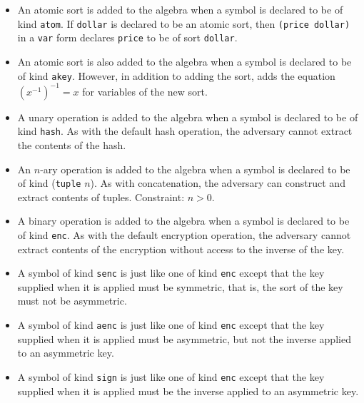 \begin{itemize}

\item An atomic sort is added to the algebra when a symbol is declared
  to be of kind \texttt{atom}.  If \texttt{dollar} is declared to be
  an atomic sort, then \verb|(price dollar)| in a \texttt{var} form
  declares \texttt{price} to be of sort \texttt{dollar}.

\item An atomic sort is also added to the algebra when a symbol is declared
  to be of kind \texttt{akey}.  However, in addition to adding the
  sort, {\cpsa} adds the equation $(x^{-1})^{-1}=x$ for variables of
  the new sort.

\item A unary operation is added to the algebra when a symbol is
  declared to be of kind \texttt{hash}.  As with the default hash
  operation, the adversary cannot extract the contents of the hash.

\item An $n$-ary operation is added to the algebra when a symbol is
  declared to be of kind (\texttt{tuple} $n$).  As with concatenation,
 the adversary can construct and extract contents of tuples.
 Constraint: $n>0$.

\item A binary operation is added to the algebra when a symbol is
  declared to be of kind \texttt{enc}.  As with the default encryption
  operation, the adversary cannot extract contents of the encryption
  without access to the inverse of the key.

\item A symbol of kind \texttt{senc} is just like one of kind
  \texttt{enc} except that the key supplied when it is applied must be
  symmetric, that is, the sort of the key must not be asymmetric.

\item A symbol of kind \texttt{aenc} is just like one of kind
  \texttt{enc} except that the key supplied when it is applied must be
  asymmetric, but not the inverse applied to an asymmetric key.

\item A symbol of kind \texttt{sign} is just like one of kind
  \texttt{enc} except that the key supplied when it is applied must be
  the inverse applied to an asymmetric key.

\end{itemize}

